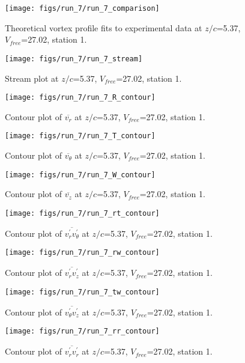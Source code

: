 \begin{figure}[H]
\centering
\texttt{[image: figs/run\_7/run\_7\_comparison]}
\caption{Theoretical vortex profile fits to experimental data at $z/c$=5.37, $V_{free}$=27.02, station 1.}
\end{figure}


\begin{figure}[H]
\centering
\texttt{[image: figs/run\_7/run\_7\_stream]}
\caption{Stream plot at $z/c$=5.37, $V_{free}$=27.02, station 1.}
\end{figure}


\begin{figure}[H]
\centering
\texttt{[image: figs/run\_7/run\_7\_R\_contour]}
\caption{Contour plot of $\overline{v_{r}}$ at $z/c$=5.37, $V_{free}$=27.02, station 1.}
\end{figure}


\begin{figure}[H]
\centering
\texttt{[image: figs/run\_7/run\_7\_T\_contour]}
\caption{Contour plot of $\overline{v_{\theta}}$ at $z/c$=5.37, $V_{free}$=27.02, station 1.}
\end{figure}


\begin{figure}[H]
\centering
\texttt{[image: figs/run\_7/run\_7\_W\_contour]}
\caption{Contour plot of $\overline{v_{z}}$ at $z/c$=5.37, $V_{free}$=27.02, station 1.}
\end{figure}


\begin{figure}[H]
\centering
\texttt{[image: figs/run\_7/run\_7\_rt\_contour]}
\caption{Contour plot of $\overline{v_{r}^{\prime} v_{\theta}^{\prime}}$ at $z/c$=5.37, $V_{free}$=27.02, station 1.}
\end{figure}


\begin{figure}[H]
\centering
\texttt{[image: figs/run\_7/run\_7\_rw\_contour]}
\caption{Contour plot of $\overline{v_{r}^{\prime} v_{z}^{\prime}}$ at $z/c$=5.37, $V_{free}$=27.02, station 1.}
\end{figure}


\begin{figure}[H]
\centering
\texttt{[image: figs/run\_7/run\_7\_tw\_contour]}
\caption{Contour plot of $\overline{v_{\theta}^{\prime} v_{z}^{\prime}}$ at $z/c$=5.37, $V_{free}$=27.02, station 1.}
\end{figure}


\begin{figure}[H]
\centering
\texttt{[image: figs/run\_7/run\_7\_rr\_contour]}
\caption{Contour plot of $\overline{v_{r}^{\prime} v_{r}^{\prime}}$ at $z/c$=5.37, $V_{free}$=27.02, station 1.}
\end{figure}


